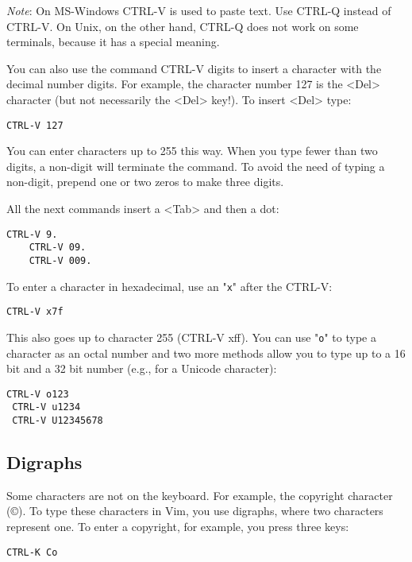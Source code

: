 \emph{Note}: On MS-Windows CTRL-V is used to paste text.
Use CTRL-Q instead of CTRL-V.
On Unix, on the other hand, CTRL-Q does not work on some terminals, because it has a special meaning.

You can also use the command CTRL-V {digits} to insert a character with the decimal number {digits}.
For example, the character number 127 is the <Del> character (but not necessarily the <Del> key!).
To insert <Del> type:

\begin{Verbatim}[samepage=true]
 CTRL-V 127
\end{Verbatim}

You can enter characters up to 255 this way.
When you type fewer than two digits, a non-digit will terminate the command.
To avoid the need of typing a non-digit, prepend one or two zeros to make three digits.

All the next commands insert a <Tab> and then a dot:

\begin{Verbatim}[samepage=true]
    CTRL-V 9.
    CTRL-V 09.
    CTRL-V 009.
\end{Verbatim}

To enter a character in hexadecimal, use an "\verb!x!" after the CTRL-V:

\begin{Verbatim}[samepage=true]
 CTRL-V x7f
\end{Verbatim}

This also goes up to character 255 (CTRL-V xff).
You can use "\verb!o!" to type a character as an octal number and two more methods allow you to type up to a 16 bit and a 32 bit number (e.g., for a Unicode character):

\begin{Verbatim}[samepage=true]
 CTRL-V o123
 CTRL-V u1234
 CTRL-V U12345678
\end{Verbatim}
\subsection{Digraphs}
\label{Digraphs}
Some characters are not on the keyboard.
For example, the copyright character (©).
To type these characters in Vim, you use digraphs, where two characters represent one.
To enter a copyright, for example, you press three keys:

\begin{Verbatim}[samepage=true]
 CTRL-K Co
\end{Verbatim}

